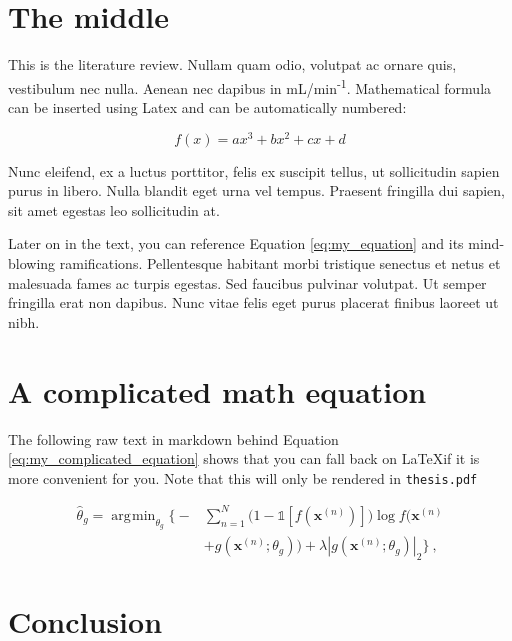 \documentclass[12pt,a4paper,]{report}
\DeclareMathOperator*{\argmin}{\arg\!\min}
\begin{document}
\hypertarget{the-middle}{%
\section{The middle}\label{the-middle}}

This is the literature review. Nullam quam odio, volutpat ac ornare
quis, vestibulum nec nulla. Aenean nec dapibus in
mL/min\textsuperscript{-1}. Mathematical formula can be inserted using
Latex and can be automatically numbered:

\begin{equation}f(x) = ax^3 + bx^2 + cx + d\label{eq:my_equation}\end{equation}

Nunc eleifend, ex a luctus porttitor, felis ex suscipit tellus, ut
sollicitudin sapien purus in libero. Nulla blandit eget urna vel tempus.
Praesent fringilla dui sapien, sit amet egestas leo sollicitudin at.

Later on in the text, you can reference Equation \ref{eq:my_equation}
and its mind-blowing ramifications. Pellentesque habitant morbi
tristique senectus et netus et malesuada fames ac turpis egestas. Sed
faucibus pulvinar volutpat. Ut semper fringilla erat non dapibus. Nunc
vitae felis eget purus placerat finibus laoreet ut nibh.

\hypertarget{a-complicated-math-equation}{%
\section{A complicated math
equation}\label{a-complicated-math-equation}}

The following raw text in markdown behind Equation
\ref{eq:my_complicated_equation} shows that you can fall back on
\LaTeX if it is more convenient for you. Note that this will only be
rendered in \texttt{thesis.pdf}

\begin{equation}
\begin{aligned}
    \hat{\theta}_g = \argmin_{\theta_g} \Big\{ - &\sum^{N}_{n=1}\Big( 1-\mathbb{1}[f(\pmb x^{(n)})]\Big)\log f\Big(\pmb x^{(n)} \\ 
    &+ g(\pmb x^{(n)};\theta_g)\Big) + \lambda|g(\pmb x^{(n)};\theta_g)|_2 \Big\} \ ,
\end{aligned}
\label{eq:my_complicated_equation}\end{equation}

\hypertarget{conclusion}{%
\section{Conclusion}\label{conclusion}}
\end{document}
